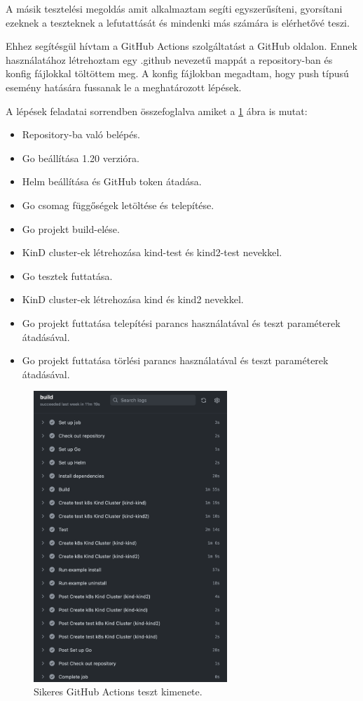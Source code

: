 A másik tesztelési megoldás amit alkalmaztam segíti egyszerűsíteni, gyorsítani ezeknek a teszteknek a lefutattását és mindenki más számára is elérhetővé teszi. 

Ehhez segítésgül hívtam a GitHub Actions szolgáltatást a GitHub oldalon.
Ennek használatához létrehoztam egy .github nevezetű mappát a repository-ban és konfig fájlokkal töltöttem meg.
A konfig fájlokban megadtam, hogy push típusú esemény hatására fussanak le a meghatározott lépések.

A lépések feladatai sorrendben összefoglalva amiket a \ref{github-actions-run-log} ábra is mutat:
\begin{itemize}
  \item Repository-ba való belépés.
  \item Go beállítása 1.20 verzióra.
  \item Helm beállítása és GitHub token átadása.
  \item Go csomag függőségek letöltése és telepítése.
  \item Go projekt build-elése.
  \item KinD cluster-ek létrehozása kind-test és kind2-test nevekkel.
  \item Go tesztek futtatása.
  \item KinD cluster-ek létrehozása kind és kind2 nevekkel.
  \item Go projekt futtatása telepítési parancs használatával és teszt paraméterek átadásával.
  \item Go projekt futtatása törlési parancs használatával és teszt paraméterek átadásával.
\end{itemize} 

\begin{figure}[ht]
  \centering
       \includegraphics[width=0.65\textwidth]{figures/kli/actions-run-log.png}
        \caption{Sikeres GitHub Actions teszt kimenete.}
         \label{github-actions-run-log}
\end{figure}

